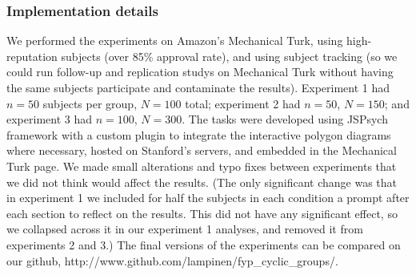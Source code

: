 \documentclass[man,10pt]{apa6}
\begin{document}
\subsubsection{Implementation details}
We performed the experiments on Amazon's Mechanical Turk, using high-reputation subjects (over 85\% approval rate), and using subject tracking (so we could run follow-up and replication studys on Mechanical Turk without having the same subjects participate and contaminate the results). Experiment 1 had $n = 50$ subjects per group, $N = 100$ total; experiment 2 had $n = 50$, $N = 150$; and experiment 3 had $n = 100$, $N = 300$. The tasks were developed using JSPsych framework with a custom plugin to integrate the interactive polygon diagrams where necessary, hosted on Stanford's servers, and embedded in the Mechanical Turk page. We made small alterations and typo fixes between experiments that we did not think would affect the results. (The only significant change was that in experiment 1 we included for half the subjects in each condition a prompt after each section to reflect on the results. This did not have any significant effect, so we collapsed across it in our experiment 1 analyses, and removed it from experiments 2 and 3.) The final versions of the experiments can be compared on our github, http://www.github.com/lampinen/fyp\_cyclic\_groups/. 
\end{document}
